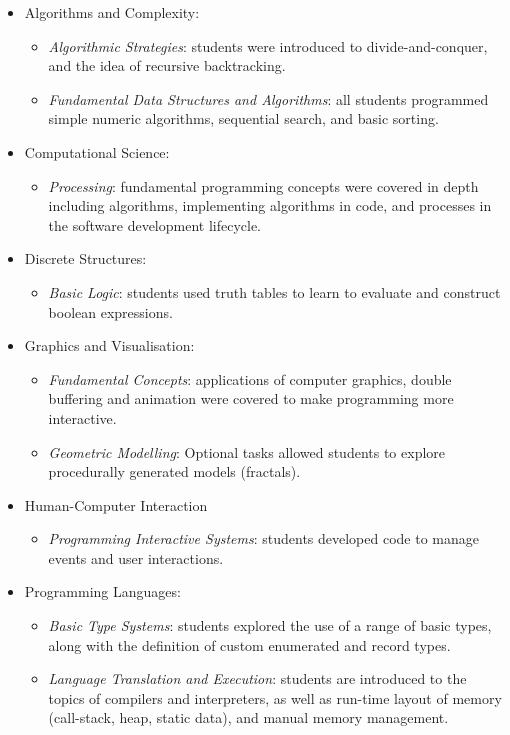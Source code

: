 \begin{itemize}[noitemsep,nolistsep]
	\item Algorithms and Complexity:
	\begin{itemize}[noitemsep,nolistsep]
		\item \emph{Algorithmic Strategies}: students were introduced to divide-and-conquer, and the idea of recursive backtracking.
		\item \emph{Fundamental Data Structures and Algorithms}: all students programmed simple numeric algorithms, sequential search, and basic sorting.
	\end{itemize}

	\item Computational Science:
	\begin{itemize}[noitemsep,nolistsep]
		\item \emph{Processing}: fundamental programming concepts were covered in depth including algorithms,  implementing algorithms in code, and processes in the software development lifecycle.
	\end{itemize}

	\item Discrete Structures:
	\begin{itemize}[noitemsep,nolistsep]
		\item \emph{Basic Logic}: students used truth tables to learn to evaluate and construct boolean expressions.
	\end{itemize}
	
	\item Graphics and Visualisation:
	\begin{itemize}[noitemsep,nolistsep]
		\item \emph{Fundamental Concepts}: applications of computer graphics, double buffering and animation were covered to make programming more interactive.
		\item \emph{Geometric Modelling}: Optional tasks allowed students to explore procedurally generated models (fractals).
	\end{itemize}

	\item Human-Computer Interaction
	\begin{itemize}[noitemsep,nolistsep]
		\item \emph{Programming Interactive Systems}: students developed code to manage events and user interactions.
	\end{itemize}

	\item Programming Languages:
	\begin{itemize}[noitemsep,nolistsep]
		\item \emph{Basic Type Systems}: students explored the use of a range of basic types, along with the definition of custom enumerated and record types.
		\item \emph{Language Translation and Execution}: students are introduced to the topics of compilers and interpreters, as well as run-time layout of memory (call-stack, heap, static data), and manual memory management.
	\end{itemize}


\end{itemize}
